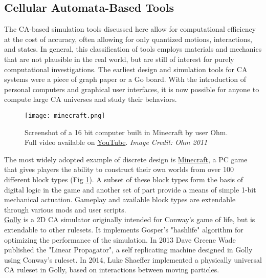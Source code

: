 {\subsection{Cellular Automata-Based Tools}

The CA-based simulation tools discussed here allow for computational efficiency at the cost of accuracy, often allowing for only quantized motions, interactions, and states.  In general, this classification of tools employs materials and mechanics that are not plausible in the real world, but are still of interest for purely computational investigations.  The earliest design and simulation tools for CA systems were a piece of graph paper or a Go board\cite{Gardner1970}.  With the introduction of personal computers and graphical user interfaces, it is now possible for anyone to compute large CA universes and study their behaviors.\\

\begin{figure}
  \texttt{[image: minecraft.png]}
  \caption{Screenshot of a 16 bit computer built in Minecraft by user Ohm.  Full video available on \href{https://www.youtube.com/watch?v=KzrFzkb3A4o}{YouTube}. \textit{Image Credit: Ohm 2011}}
  \label{fig:minecraft}
\end{figure}

The most widely adopted example of discrete design is \href{https://minecraft.net/}{Minecraft}, a PC game that gives players the ability to construct their own worlds from over 100 different block types (Fig \ref{fig:minecraft}).  A subset of these block types form the basis of digital logic in the game and another set of part provide a means of simple 1-bit mechanical actuation\cite{MinecraftWik2016}.  Gameplay and available block types are extendable through various mods and user scripts.
\\

\href{http://golly.sourceforge.net/}{Golly} is a 2D CA simulator originally intended for Conway's game of life, but is extendable to other rulesets.  It implements Gosper's "hashlife" algorithm for optimizing the performance of the simulation\cite{Gosper1984}.  In 2013 Dave Greene Wade published the "Linear Propagator", a self replicating machine designed in Golly using Conway's ruleset\cite{Greene2013a}.  In 2014, Luke Shaeffer implemented a physically universal CA ruleset in Golly, based on interactions between moving particles\cite{Shaffer2014}.\\

}
